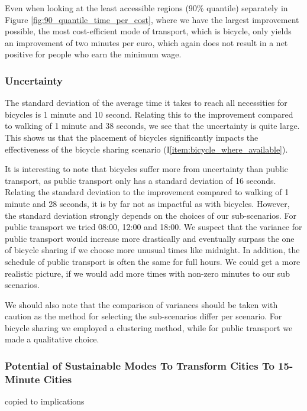 Even when looking at the least accessible regions (90\% quantile) separately in Figure \ref{fig:90_quantile_time_per_cost}, where we have the largest improvement possible, the most cost-efficient mode of transport, which is bicycle, only yields an improvement of two minutes per euro, which again does not result in a net positive for people who earn the minimum wage.



\subsubsection{Uncertainty}

The standard deviation of the average time it takes to reach all necessities for bicycles is 1 minute and 10 second. 
Relating this to the improvement compared to walking of 1 minute and 38 seconds, we see that the uncertainty is quite large.
This shows us that the placement of bicycles significantly impacts the effectiveness of the bicycle sharing scenario (I\ref{item:bicycle_where_available}).

It is interesting to note that bicycles suffer more from uncertainty than public transport, as public transport only has a standard deviation of 16 seconds.
Relating the standard deviation to the improvement compared to walking of 1 minute and 28 seconds, it is by far not as impactful as with bicycles.
However, the standard deviation strongly depends on the choices of our sub-scenarios. 
For public transport we tried 08:00, 12:00 and 18:00.
We suspect that the variance for public transport would increase more drastically and eventually surpass the one of bicycle sharing if we choose more unusual times like midnight.
In addition, the schedule of public transport is often the same for full hours.
We could get a more realistic picture, if we would add more times with non-zero minutes to our sub scenarios.

We should also note that the comparison of variances should be taken with caution as the method for selecting the sub-scenarios differ per scenario.
For bicycle sharing we employed a clustering method, while for public transport we made a qualitative choice. 

\subsubsection{Potential of Sustainable Modes To Transform Cities To 15-Minute Cities}

copied to implications

